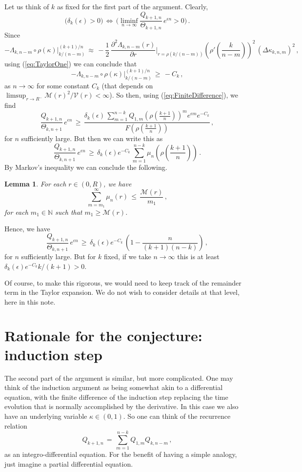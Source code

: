 \documentclass[12pt]{article}
\newtheorem{lemma}[thm]{Lemma}
\newcommand{\N}{\mathbb{N}}
\begin{document}
Let us think of $k$ as fixed for the first part of the argument.
Clearly,
$$
\Big(\delta_k(\epsilon) > 0\Big)\, \Leftrightarrow\,
\Big(\liminf_{n \to \infty} 
\frac{Q_{k+1,n}}{\Theta_{k+1,n}}\, e^{\epsilon n} > 0 \Big)\, .
$$
Since
$$
-\Lambda_{k,n-m}\circ \rho(\kappa)\Bigg|_{k/(n-m)}^{(k+1)/n}\, \approx\, -\frac{1}{2}\, \frac{\partial^2 \Lambda_{k,n-m}(r)}{\partial r}\Bigg|_{r=\rho(k/(n-m))}
\left(\rho'\left(\frac{k}{n-m}\right)\right)^2\, \left(\Delta \kappa_{k,n,m}\right)^2\, ,
$$
using (\ref{eq:TaylorOne})
we can conclude that
$$
-\Lambda_{k,n-m}\circ \rho(\kappa)\Bigg|_{k/(n-m)}^{(k+1)/n}\, \geq\, - C_k\, ,
$$
as $n \to \infty$ for some constant $C_k$ (that depends on $\limsup_{r \to R^-} \mathcal{M}(r)^2/\mathcal{V}(r)<\infty$).
So then, using (\ref{eq:FiniteDifference}),
we find
$$
\frac{Q_{k+1,n}}{\Theta_{k,n+1}}\, e^{\epsilon n}\, 
\geq\, \frac{\delta_k(\epsilon)\, 
\sum_{m=1}^{n-k} Q_{1,m} \left(\rho\left(\frac{k+1}{n}\right)\right)^m e^{\epsilon m} e^{-C_k}}
{F\left(\rho\left(\frac{k+1}{n}\right)\right)}\, ,
$$
for $n$ sufficiently large.
But then we can write this as 
$$
\frac{Q_{k+1,n}}{\Theta_{k,n+1}}\, e^{\epsilon n}\, 
\geq\, \delta_k(\epsilon) e^{-C_k}\,  
\sum_{m=1}^{n-k} \mu_n\left(\rho\left(\frac{k+1}{n}\right)\right)\, .
$$
By Markov's inequality we can conclude the following.
\begin{lemma}
\label{lem:Markov}
For each $r \in (0,R)$, we have
$$
\sum_{m=m_1}^{\infty} \mu_n(r)\, \leq\, \frac{\mathcal{M}(r)}{m_1}\, ,
$$
for each $m_1 \in \N$ such that $m_1 \geq \mathcal{M}(r)$.
\end{lemma}
Hence, we have
$$
\frac{Q_{k+1,n}}{\Theta_{k,n+1}}\, e^{\epsilon n}\, 
\geq\, \delta_k(\epsilon) e^{-C_k}\,  \left(1 - \frac{n}{(k+1)(n-k)}\right)\, ,
$$
for $n$ sufficiently large.
But for $k$ fixed, if we take $n \to \infty$ this is at least $\delta_k(\epsilon) e^{-C_k}k/(k+1)>0$.

Of course, to make this rigorous, we would need to keep track of the remainder term in the Taylor expansion.
We do not wish to consider details at that level, here in this note.

\section{Rationale for the conjecture: induction step}


The second part of the argument is similar, but more complicated.
One may think of the induction argument as being somewhat akin to a differential
equation, with the finite difference of the induction step replacing the time evolution that is normally accomplished by
the derivative.
In this case we also have an underlying variable $\kappa \in (0,1)$.
So one can think of the recurrence relation
$$
Q_{k+1,n}\, =\, \sum_{m=1}^{n-k} Q_{1,m} Q_{k,n-m}\, ,
$$
as an integro-differential equation.
For the benefit of having a simple analogy, just imagine a partial differential equation.
\end{document}
